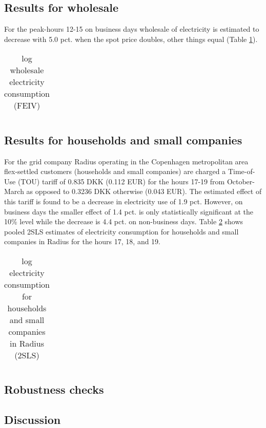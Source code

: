 \label{sec:results}
\subsection{Results for wholesale}
\label{subsec:r_wholesale}
For the peak-hours 12-15 on business days wholesale of electricity is estimated to decrease with 5.0 pct. when the spot price doubles, other things equal (Table \ref{tab:ws_preferred}).
\begin{table}[H]
  \vspace{-0.0cm}
  \centering
  \caption{log wholesale electricity consumption (FEIV)}
  \footnotesize
    \begin{tabular}{lc}
      \toprule
        
    \end{tabular}
  \label{tab:ws_preferred}
  \vspace{-0.0cm}
\end{table}

\subsection{Results for households and small companies}
For the grid company Radius operating in the Copenhagen metropolitan area flex-settled customers (households and small companies) are charged a Time-of-Use (TOU) tariff of 0.835 DKK (0.112 EUR) for the hours 17-19 from October-March as opposed to 0.3236 DKK otherwise (0.043 EUR). The estimated effect of this tariff is found to be a decrease in electricity use of 1.9 pct. However, on business days the smaller effect of 1.4 pct. is only statistically significant at the 10\% level while the decrease is 4.4 pct. on non-business days. Table \ref{tab:hh_17-19} shows pooled 2SLS estimates of electricity consumption for households and small companies in Radius for the hours 17, 18, and 19.
\label{subsec:r_households}
\begin{table}[H]
  \vspace{-0.0cm}
  \centering
  \caption{log electricity consumption for households and small companies in Radius (2SLS)}
  \footnotesize
    \begin{tabular}{lccc}
      \toprule
        
    \end{tabular}
  \label{tab:hh_17-19}
  \vspace{-0.0cm}
\end{table}


\subsection{Robustness checks}
\label{subsec:r_robustness}


\subsection{Discussion}
\label{subsec:discussion}
